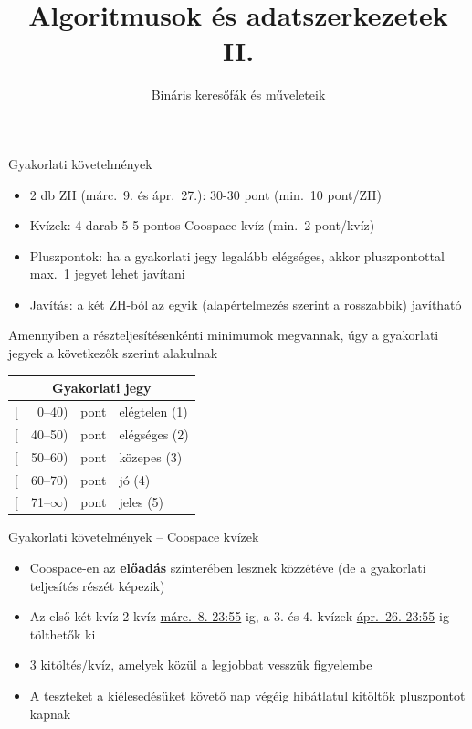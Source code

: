 \documentclass{beamer}
\institute{Szegedi Tudományegyetem}
\title{Algoritmusok és adatszerkezetek II.}
\subtitle{Bináris keresőfák és műveleteik}
\date{}
\begin{document}
\maketitle

\begin{frame}{Gyakorlati követelmények}
	\begin{itemize}
		\item 2 db ZH (márc.~9. és ápr.~27.): 30-30 pont (min.~10 pont/ZH)
		\item Kvízek: 4 darab 5-5 pontos Coospace kvíz (min.~2 pont/kvíz)
		\item Pluszpontok: ha a gyakorlati jegy legalább elégséges, akkor 
		pluszpontottal max.~1 jegyet lehet javítani
		\item Javítás: a két ZH-ból az egyik (alapértelmezés szerint a 
		rosszabbik) javítható
	\end{itemize}
	\pause
	Amennyiben a részteljesítésenkénti minimumok megvannak, úgy a gyakorlati 
	jegyek a következők szerint alakulnak
	\begin{table}
	\centering
	\begin{tabular}{r@{}r@{ }ll}
		\multicolumn{4}{c}{Gyakorlati jegy} \\ \hline
		{[}&0--40)  & pont & elégtelen (1) \\
		{[}&40--50) & pont & elégséges (2) \\
		{[}&50--60) & pont & közepes (3) \\
		{[}&60--70) & pont & jó (4) \\
		{[}&71--$\infty$) & pont & jeles (5)
	\end{tabular}
    \end{table}
\end{frame}

\begin{frame}{Gyakorlati követelmények -- Coospace kvízek}
	\begin{itemize}
		\item Coospace-en az \textbf{előadás} színterében lesznek közzétéve (de 
		a gyakorlati teljesítés részét képezik)
		\item Az első két kvíz 2 kvíz 
		\href{https://tinyurl.com/ts359zz}{márc.~8. 23:55}-ig, a 3. 
		és 4. kvízek \href{https://tinyurl.com/rkxjuth}{ápr.~26. 23:55}-ig 
		tölthetők ki
		\item 3 kitöltés/kvíz, amelyek közül a legjobbat vesszük figyelembe
		\pause
		\item A teszteket a kiélesedésüket követő nap végéig hibátlatul 
		kitöltők pluszpontot kapnak
	\end{itemize}
\end{frame}
\end{document}

